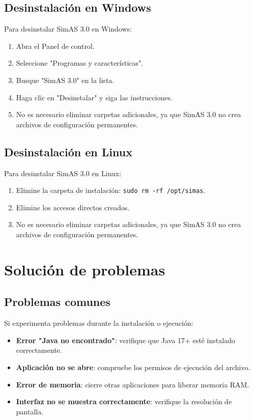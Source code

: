\subsection{Desinstalación en Windows}

Para desinstalar SimAS 3.0 en Windows:

\begin{enumerate}
    \item Abra el Panel de control.
    \item Seleccione \string"Programas y características\string".
    \item Busque \string"SimAS 3.0\string" en la lista.
    \item Haga clic en \string"Desinstalar\string" y siga las instrucciones.
    \item No es necesario eliminar carpetas adicionales, ya que SimAS 3.0 no crea archivos de configuración permanentes.
\end{enumerate}

\subsection{Desinstalación en Linux}

Para desinstalar SimAS 3.0 en Linux:

\begin{enumerate}
    \item Elimine la carpeta de instalación: \texttt{sudo rm -rf /opt/simas}.
    \item Elimine los accesos directos creados.
    \item No es necesario eliminar carpetas adicionales, ya que SimAS 3.0 no crea archivos de configuración permanentes.
\end{enumerate}

\section{Solución de problemas}

\subsection{Problemas comunes}

Si experimenta problemas durante la instalación o ejecución:

\begin{itemize}
    \item \textbf{Error \string"Java no encontrado\string"}: verifique que Java 17+ esté instalado correctamente.
    \item \textbf{Aplicación no se abre}: compruebe los permisos de ejecución del archivo.
    \item \textbf{Error de memoria}: cierre otras aplicaciones para liberar memoria RAM.
    \item \textbf{Interfaz no se muestra correctamente}: verifique la resolución de pantalla.
\end{itemize}


